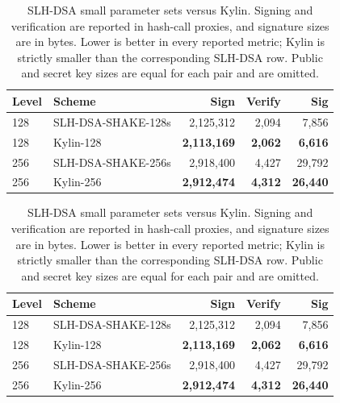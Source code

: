 \ifnum{}

\begin{table}[ht]
    \centering
    \caption{SLH-DSA small parameter sets versus Kylin. Signing and verification are reported in hash-call proxies, and signature sizes are in bytes. Lower is better in every reported metric; Kylin is strictly smaller than the corresponding SLH-DSA row. Public and secret key sizes are equal for each pair and are omitted.}
    \label{tab:comp tiny}
    \begin{tabular}{l l r r r}%
    \toprule
      Level & Scheme & Sign & Verify & Sig \\ \midrule
      128 & SLH-DSA-SHAKE-128s & 2,125,312 & 2,094 & 7,856 \\
      128 & Kylin-128 & \textbf{2,113,169} & \textbf{2,062} & \textbf{6,616} \\
      256 & SLH-DSA-SHAKE-256s & 2,918,400 & 4,427 & 29,792 \\
      256 & Kylin-256 & \textbf{2,912,474} & \textbf{4,312} & \textbf{26,440} \\
      \bottomrule
    \end{tabular}
\end{table}

\else
\begin{table}[th]
    \centering
    \caption{SLH-DSA small parameter sets versus Kylin. Signing and verification are reported in hash-call proxies, and signature sizes are in bytes. Lower is better in every reported metric; Kylin is strictly smaller than the corresponding SLH-DSA row. Public and secret key sizes are equal for each pair and are omitted.}
    \label{tab:comp tiny}
    \begin{tabular}{l l r r r}%
    \toprule
      Level & Scheme & Sign & Verify & Sig \\ \midrule
      128 & SLH-DSA-SHAKE-128s & 2,125,312 & 2,094 & 7,856 \\
      128 & Kylin-128 & \textbf{2,113,169} & \textbf{2,062} & \textbf{6,616} \\
      256 & SLH-DSA-SHAKE-256s & 2,918,400 & 4,427 & 29,792 \\
      256 & Kylin-256 & \textbf{2,912,474} & \textbf{4,312} & \textbf{26,440} \\
      \bottomrule
    \end{tabular}
\end{table}

\fi
